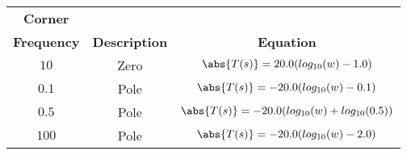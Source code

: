 \begin{tabular}{|c|c|c|}
\hline
     \textbf{Corner}&&\\ \textbf{Frequency} & \textbf{Description} & \textbf{Equation} \\
     \hline
     $10$ &  Zero & $\abs{T(s)} = 20.0 (log_{10}(w) - 1.0)$\\
     \hline
     $0.1$ & Pole & $\abs{T(s)} = -20.0 (log_{10}(w) - 0.1)$\\
     \hline
     $0.5$ & Pole & $\abs{T(s)} = -20.0 (log_{10}(w) + log_{10}(0.5))$\\
     \hline
     $100$ & Pole & $\abs{T(s)} = -20.0 (log_{10}(w) - 2.0)$\\
     \hline
\end{tabular}
